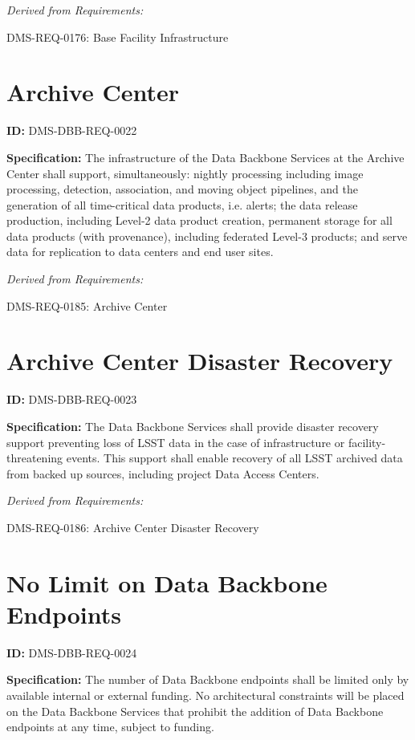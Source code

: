 \documentclass[SE,toc,lsstdraft]{lsstdoc}
\begin{document}
\emph{Derived from Requirements:}

DMS-REQ-0176:
Base Facility Infrastructure \newline

\section{Archive Center}

\label{DMS-DBB-REQ-0022}
\textbf{ID:} DMS-DBB-REQ-0022

\textbf{Specification:}
The infrastructure of the Data Backbone Services at the Archive Center shall support, simultaneously: nightly processing including image processing, detection, association, and moving object pipelines, and the generation of all time-critical data products, i.e. alerts; the data release production, including Level-2 data product creation, permanent storage for all data products (with provenance), including federated Level-3 products; and serve data for replication to data centers and end user sites.

\emph{Derived from Requirements:}

DMS-REQ-0185:
Archive Center \newline

\section{Archive Center Disaster Recovery}

\label{DMS-DBB-REQ-0023}
\textbf{ID:} DMS-DBB-REQ-0023

\textbf{Specification:}
The Data Backbone Services shall provide disaster recovery support preventing loss of LSST data in the case of infrastructure or facility-threatening events. This support shall enable recovery of all LSST archived data from backed up sources, including project Data Access Centers.

\emph{Derived from Requirements:}

DMS-REQ-0186:
Archive Center Disaster Recovery \newline

\section{No Limit on Data Backbone Endpoints}

\label{DMS-DBB-REQ-0024}
\textbf{ID:} DMS-DBB-REQ-0024

\textbf{Specification:}
The number of Data Backbone endpoints shall be limited only by available internal or external funding. No architectural constraints will be placed on the Data Backbone Services that prohibit the addition of Data Backbone endpoints at any time, subject to funding.
\end{document}
